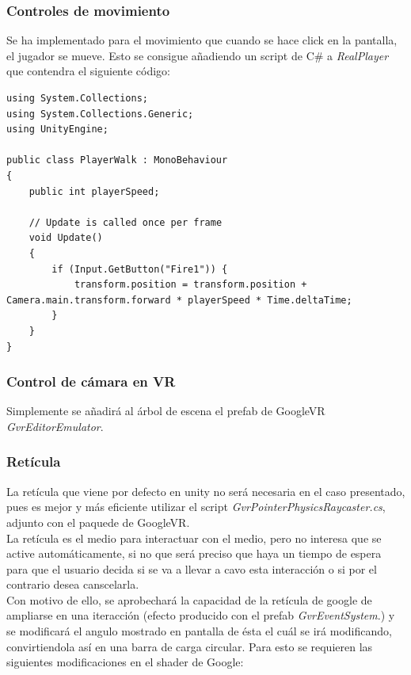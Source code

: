 \subsubsection{Controles de movimiento}

\quad Se ha implementado para el movimiento que cuando se hace click en la pantalla, el jugador se mueve. Esto se consigue añadiendo un script de C\# a \textit{RealPlayer} que contendra el siguiente código:

\lstset{language=[sharp]C, breaklines=true, basicstyle=\footnotesize}
\begin{lstlisting}[frame=single, caption={PlayerWalk.cs}]
using System.Collections;
using System.Collections.Generic;
using UnityEngine;

public class PlayerWalk : MonoBehaviour
{
    public int playerSpeed;

    // Update is called once per frame
    void Update()
    {
        if (Input.GetButton("Fire1")) {
            transform.position = transform.position + Camera.main.transform.forward * playerSpeed * Time.deltaTime;
        }
    }
}
\end{lstlisting}

\subsubsection{Control de cámara en VR}

\quad Simplemente se añadirá al árbol de escena el prefab de GoogleVR \textit{GvrEditorEmulator}.

\subsubsection{Retícula}

\quad La retícula que viene por defecto en unity no será necesaria en el caso presentado, pues es mejor y más eficiente utilizar el script \textit{GvrPointerPhysicsRaycaster.cs}, adjunto con el paquede de GoogleVR.\\

\quad La retícula es el medio para interactuar con el medio, pero no interesa que se active automáticamente, si no que será preciso que haya un tiempo de espera para que el usuario decida si se va a llevar a cavo esta interacción o si por el contrario desea canscelarla.\\

\quad Con motivo de ello, se aprobechará la capacidad de la retícula de google de ampliarse en una iteracción (efecto producido con el prefab \textit{GvrEventSystem}.) y se modificará el angulo mostrado en pantalla de ésta el cuál se irá modificando, convirtiendola así en una barra de carga circular. Para esto se requieren las siguientes modificaciones en el shader de Google:

